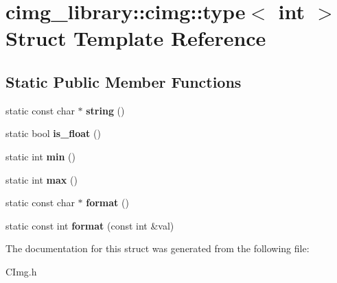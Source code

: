 \hypertarget{structcimg__library_1_1cimg_1_1type_3_01int_01_4}{\section{cimg\-\_\-library\-:\-:cimg\-:\-:type$<$ int $>$ Struct Template Reference}
\label{structcimg__library_1_1cimg_1_1type_3_01int_01_4}
}
\subsection*{Static Public Member Functions}
\begin{DoxyCompactItemize}
\item 
\hypertarget{structcimg__library_1_1cimg_1_1type_3_01int_01_4_a96c94f97bd8eb1f4560ee6077d3bf37a}{static const char $\ast$ {\bfseries string} ()}\label{structcimg__library_1_1cimg_1_1type_3_01int_01_4_a96c94f97bd8eb1f4560ee6077d3bf37a}

\item 
\hypertarget{structcimg__library_1_1cimg_1_1type_3_01int_01_4_ade4be0635e62b7c295721f64fe7a6904}{static bool {\bfseries is\-\_\-float} ()}\label{structcimg__library_1_1cimg_1_1type_3_01int_01_4_ade4be0635e62b7c295721f64fe7a6904}

\item 
\hypertarget{structcimg__library_1_1cimg_1_1type_3_01int_01_4_a2a75f3293c792a87cea5d04553475e23}{static int {\bfseries min} ()}\label{structcimg__library_1_1cimg_1_1type_3_01int_01_4_a2a75f3293c792a87cea5d04553475e23}

\item 
\hypertarget{structcimg__library_1_1cimg_1_1type_3_01int_01_4_a250a2545cef23bd0fa1ada241104dcc1}{static int {\bfseries max} ()}\label{structcimg__library_1_1cimg_1_1type_3_01int_01_4_a250a2545cef23bd0fa1ada241104dcc1}

\item 
\hypertarget{structcimg__library_1_1cimg_1_1type_3_01int_01_4_a3b40f21ad44b655569c16303e286a436}{static const char $\ast$ {\bfseries format} ()}\label{structcimg__library_1_1cimg_1_1type_3_01int_01_4_a3b40f21ad44b655569c16303e286a436}

\item 
\hypertarget{structcimg__library_1_1cimg_1_1type_3_01int_01_4_a66a9311c4164cac3918b23ed31157041}{static const int {\bfseries format} (const int \&val)}\label{structcimg__library_1_1cimg_1_1type_3_01int_01_4_a66a9311c4164cac3918b23ed31157041}

\end{DoxyCompactItemize}


The documentation for this struct was generated from the following file\-:\begin{DoxyCompactItemize}
\item 
C\-Img.\-h\end{DoxyCompactItemize}
